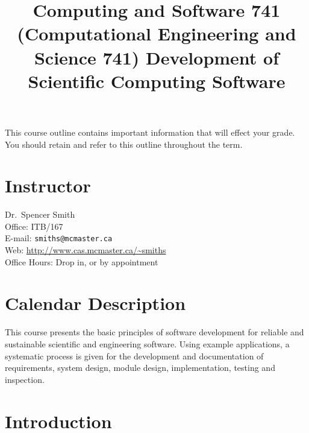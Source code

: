 \documentclass[12pt]{article}
\title{Computing and Software 741 (Computational Engineering and Science 741)
  Development of Scientific Computing Software}
\begin{document}
\maketitle

This course outline contains important information that will effect your
grade.  You should retain and refer to this outline throughout the term.

\section {Instructor}

Dr.~Spencer Smith\\
Office: ITB/167\\
E-mail: \texttt{smiths@mcmaster.ca}\\
Web: \url{http://www.cas.mcmaster.ca/~smiths}\\
Office Hours: Drop in, or by appointment\\

\section{Calendar Description} 

This course presents the basic principles of software development for reliable
and sustainable scientific and engineering software.  Using example
applications, a systematic process is given for the development and
documentation of requirements, system design, module design, implementation,
testing and inspection.

\section{Introduction}
\end{document}
